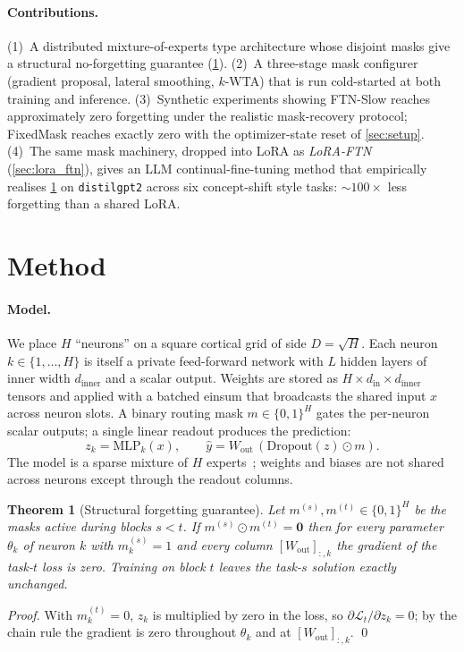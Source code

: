 \documentclass{article}
\theoremstyle{plain}
\newtheorem{theorem}{Theorem}[section]
\theoremstyle{remark}
\begin{document}
\paragraph{Contributions.}
(1)~A distributed mixture-of-experts type architecture whose disjoint masks give a structural no-forgetting guarantee (\cref{thm:isolation}).
(2)~A three-stage mask configurer (gradient proposal, lateral smoothing, $k$-WTA) that is run cold-started at both training and inference.
(3)~Synthetic experiments showing FTN-Slow reaches approximately zero forgetting under the realistic mask-recovery protocol; FixedMask reaches exactly zero with the optimizer-state reset of \cref{sec:setup}.
(4)~The same mask machinery, dropped into LoRA as \emph{LoRA-FTN} (\cref{sec:lora_ftn}), gives an LLM continual-fine-tuning method that empirically realises \cref{thm:isolation} on \texttt{distilgpt2} across six concept-shift style tasks: $\sim\!100\times$ less forgetting than a shared LoRA.

\section{Method}
\label{sec:method}

\paragraph{Model.}
We place $H$ ``neurons'' on a square cortical grid of side $D=\sqrt{H}$. Each neuron $k\in\{1,\ldots,H\}$ is itself a private feed-forward network with $L$ hidden layers of inner width $d_\mathrm{inner}$ and a scalar output. Weights are stored as $H\times d_\mathrm{in}\times d_\mathrm{inner}$ tensors and applied with a batched einsum that broadcasts the shared input $x$ across neuron slots. A binary routing mask $m\in\{0,1\}^H$ gates the per-neuron scalar outputs; a single linear readout produces the prediction:
\[
  z_k = \mathrm{MLP}_k(x), \qquad \hat y = W_\mathrm{out}\,(\mathrm{Dropout}(z)\odot m).
\]
The model is a sparse mixture of $H$ experts~\citep{shazeer2017outrageously}; weights and biases are not shared across neurons except through the readout columns.

\begin{theorem}[Structural forgetting guarantee]
\label{thm:isolation}
Let $m^{(s)},m^{(t)}\in\{0,1\}^H$ be the masks active during blocks $s<t$. If $m^{(s)}\odot m^{(t)}=\mathbf{0}$ then for every parameter $\theta_k$ of neuron $k$ with $m^{(s)}_k=1$ and every column $[W_\mathrm{out}]_{:,k}$ the gradient of the task-$t$ loss is zero. Training on block $t$ leaves the task-$s$ solution exactly unchanged.
\end{theorem}
\begin{proof}
With $m^{(t)}_k=0$, $z_k$ is multiplied by zero in the loss, so $\partial\mathcal{L}_t/\partial z_k=0$; by the chain rule the gradient is zero throughout $\theta_k$ and at $[W_\mathrm{out}]_{:,k}$. \qed
\end{proof}
\end{document}
